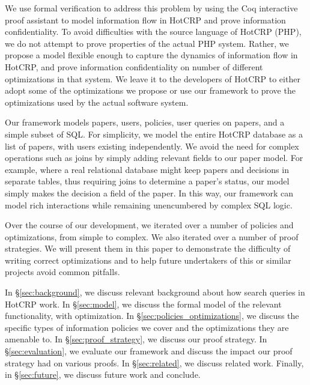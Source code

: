 \documentclass[11pt,journal]{IEEEtran}
\begin{document}
We use formal verification to address this problem by using the Coq interactive proof assistant\cite{coq} to model information flow in HotCRP and prove information confidentiality.  To avoid difficulties with the source language of HotCRP (PHP), we do not attempt to prove properties of the actual PHP system.  Rather, we propose a model flexible enough to capture the dynamics of information flow in HotCRP, and prove information confidentiality on number of different optimizations in that system.  We leave it to the developers of HotCRP to either adopt some of the optimizations we propose or use our framework to prove the optimizations used by the actual software system.

Our framework models papers, users, policies, user queries on papers, and a simple subset of SQL.  For simplicity, we model the entire HotCRP database as a list of papers, with users existing independently.  We avoid the need for complex operations such as joins by simply adding relevant fields to our paper model.  For example, where a real relational database might keep papers and decisions in separate tables, thus requiring joins to determine a paper's status, our model simply makes the decision a field of the paper.  In this way, our framework can model rich interactions while remaining unencumbered by complex SQL logic.

Over the course of our development, we iterated over a number of policies and optimizations, from simple to complex.  We also iterated over a number of proof strategies.  We will present them in this paper to demonstrate the difficulty of writing correct optimizations and to help future undertakers of this or similar projects avoid common pitfalls.

In \S\ref{sec:background}, we discuss relevant background about how search queries in HotCRP work.  In \S\ref{sec:model}, we discuss the formal model of the relevant functionality, with optimization.  In \S\ref{sec:policies_optimizations}, we discuss the specific types of information policies we cover and the optimizations they are amenable to.  In \S\ref{sec:proof_strategy}, we discuss our proof strategy.  In \S\ref{sec:evaluation}, we evaluate our framework and discuss the impact our proof strategy had on various proofs.  In \S\ref{sec:related}, we discuss related work.  Finally, in \S\ref{sec:future}, we discuss future work and conclude.
\end{document}
